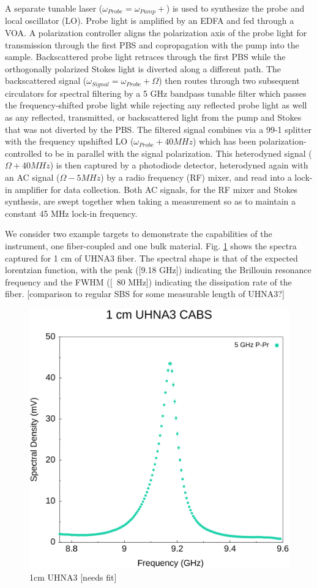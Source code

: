 \documentclass[sn-nature]{sn-jnl}%
\begin{document}
A separate tunable laser ($\omega_{Probe} = \omega_{Pump} + $) is used to synthesize the probe and local oscillator (LO). Probe light is amplified by an EDFA and fed through a VOA. A polarization controller aligns the polarization axis of the probe light for transmission through the first PBS and copropagation with the pump into the sample. Backscattered probe light retraces through the first PBS while the orthogonally polarized Stokes light is diverted along a different path. The backscattered signal ($\omega_{Signal} = \omega_{Probe} + \Omega$) then routes through two subsequent circulators for spectral filtering by a 5 GHz bandpass tunable filter which passes the frequency-shifted probe light while rejecting any reflected probe light as well as any reflected, transmitted, or backscattered light from the pump and Stokes that was not diverted by the PBS. The filtered signal combines via a 99-1 splitter with the frequency upshifted LO ($\omega_{Probe} + 40 MHz$) which has been polarization-controlled to be in parallel with the signal polarization. This heterodyned signal ($\Omega + 40 MHz$) is then captured by a photodiode detector, heterodyned again with an AC signal ($\Omega - 5 MHz$) by a radio frequency (RF) mixer, and read into a lock-in amplifier for data collection. Both AC signals, for the RF mixer and Stokes synthesis, are swept together when taking a measurement so as to maintain a constant 45 MHz lock-in frequency.

We consider two example targets to demonstrate the capabilities of the instrument, one fiber-coupled and one bulk material. Fig. \ref{fig:1cmUHNA3} shows the spectra captured for 1 cm of UHNA3 fiber. The spectral shape is that of the expected lorentzian function, with the peak ([9.18 GHz]) indicating the Brillouin resonance frequency and the FWHM ([~80 MHz]) indicating the dissipation rate of the fiber. [comparison to regular SBS for some measurable length of UHNA3?]\\

\begin{figure}[t]
  \centering
  \includegraphics[width=.45\textwidth]{1cmUHNA3.pdf}
  \caption{1cm UHNA3 [needs fit]}\label{fig:1cmUHNA3}
\end{figure}
\end{document}
